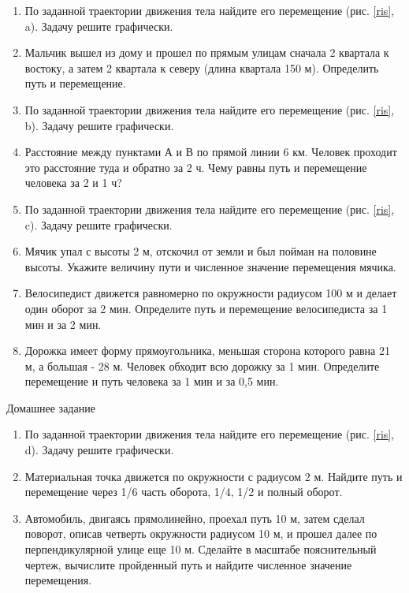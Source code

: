 \documentclass[a6paper, 11pt]{diss_4}
\renewcommand{\'}{\,'}
\begin{document}
\begin{enumerate}
\item По заданной траектории движения тела найдите его перемещение (рис. \ref{ris}, a). Задачу решите графически.

\item Мальчик вышел из дому и прошел по прямым улицам сначала 2 квартала к востоку, а затем 2 квартала к северу (длина квартала 150 м). Определить путь и перемещение.
\item По заданной траектории движения тела найдите его перемещение (рис. \ref{ris}, b). Задачу решите графически.
\item Расстояние между пунктами А и В по прямой линии 6 км. Человек проходит это расстояние туда и обратно за 2 ч. Чему равны путь и перемещение человека за 2 и 1 ч?
\item По заданной траектории движения тела найдите его перемещение (рис. \ref{ris}, c). Задачу решите графически.
\item Мячик упал с высоты 2 м, отскочил от земли и был пойман на половине высоты. Укажите величину пути и численное значение перемещения мячика.
\item Велосипедист движется равномерно по окружности радиусом 100 м и делает один оборот за 2 мин. Определите путь и перемещение велосипедиста за 1 мин и за 2 мин.
\item Дорожка имеет форму прямоугольника, меньшая сторона которого равна 21 м, а большая - 28 м. Человек обходит всю дорожку за 1 мин. Определите перемещение и путь человека за 1 мин и за 0,5 мин.
\end{enumerate}

\begin{center}
   Домашнее задание
\end{center}

\begin{enumerate}
\item По заданной траектории движения тела найдите его перемещение (рис. \ref{ris}, d). Задачу решите графически.
\item Материальная точка движется по окружности с радиусом 2 м. Найдите путь и перемещение через 1/6 часть оборота, 1/4, 1/2 и полный оборот.
\item Автомобиль, двигаясь прямолинейно, проехал путь 10 м, затем сделал поворот, описав четверть окружности радиусом 10 м, и прошел далее по перпендикулярной улице еще 10 м. Сделайте в масштабе пояснительный чертеж, вычислите пройденный путь и найдите численное значение перемещения.
\end{enumerate}
\end{document}
